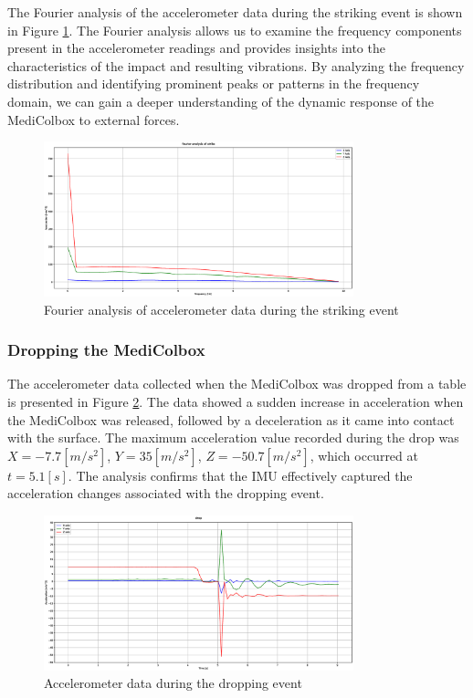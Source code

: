 \documentclass[../main.tex]{subfiles}
\begin{document}
The Fourier analysis of the accelerometer data during the
striking event is shown in
Figure \ref{fig:fourier_accelerometer_striking}.
The Fourier analysis allows us to examine the
frequency components present in the accelerometer readings and
provides insights into the characteristics of the
impact and resulting vibrations.
By analyzing the frequency distribution and
identifying prominent peaks or patterns in the frequency domain,
we can gain a deeper understanding of the
dynamic response of the MediColbox to external forces.

\begin{figure}[htbp]
\centering
\includegraphics[width=0.8\textwidth]{resources/figures/Fourier_acceleration_strike.eps}
\caption{Fourier analysis of accelerometer data during the striking event}
\label{fig:fourier_accelerometer_striking}
\end{figure}

\clearpage
\subsubsection{Dropping the MediColbox}

The accelerometer data collected when the MediColbox was
dropped from a table is presented in
Figure \ref{fig:accelerometer_dropping}.
The data showed a sudden increase in acceleration when the
MediColbox was released,
followed by a deceleration as it came into contact with the
surface. The maximum acceleration value recorded during the
drop was
$X = -7.7 [m/s^2]$, $Y = 35 [m/s^2]$, $Z = -50.7 [m/s^2]$,
which occurred at $t = 5.1[s]$.
The analysis confirms that the IMU effectively captured the
acceleration changes associated with the dropping event.

\begin{figure}[htbp]
    \centering
    \includegraphics[width=0.8\textwidth]{resources/figures/Acceleration_drop.eps}
    \caption{Accelerometer data during the dropping event}
    \label{fig:accelerometer_dropping}
\end{figure}
\end{document}

